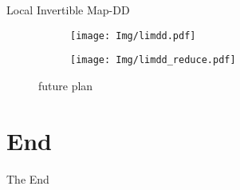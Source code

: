\documentclass[aspectratio=1610]{beamer}
\begin{document}
\begin{frame}{Local Invertible Map-DD}
    \begin{figure}
        \begin{subfigure}{0.4\textwidth}
            \centering
            \texttt{[image: Img/limdd.pdf]}
        \end{subfigure}
        \begin{subfigure}{0.4\textwidth}
            \centering
            \texttt{[image: Img/limdd\_reduce.pdf]}
        \end{subfigure}
        \caption{ future plan}
    \end{figure}
\end{frame}

\section*{End}
\begin{frame}
    \centering
    \Huge The End
\end{frame}
\end{document}
